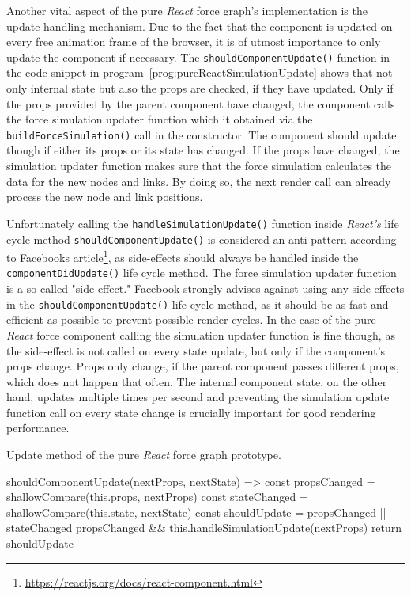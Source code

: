 Another vital aspect of the pure \emph{React} force graph's implementation is the update handling mechanism. Due to the fact that the component is updated on every free animation frame of the browser, it is of utmost importance to only update the component if necessary. The \texttt{shouldComponentUpdate()} function in the code snippet in program~\ref{prog:pureReactSimulationUpdate} shows that not only internal state but also the props are checked, if they have updated. Only if the props provided by the parent component have changed, the component calls the force simulation updater function which it obtained via the \texttt{buildForceSimulation()} call in the constructor. The component should update though if either its props or its state has changed. If the props have changed, the simulation updater function makes sure that the force simulation calculates the data for the new nodes and links. By doing so, the next render call can already process the new node and link positions.

Unfortunately calling the \texttt{handleSimulationUpdate()} function inside \emph{React's} life cycle method \texttt{should\-Component\-Update()} is considered an anti-pattern according to Facebooks article\footnote{\url{https://reactjs.org/docs/react-component.html}}, as side-effects should always be handled inside the \texttt{component\-Did\-Update()} life cycle method. The force simulation updater function is a so-called "side effect." Facebook strongly advises against using any side effects in the \texttt{should\-Component\-Update()} life cycle method, as it should be as fast and efficient as possible to prevent possible render cycles. In the case of the pure \emph{React} force component calling the simulation updater function is fine though, as the side-effect is not called on every state update, but only if the component's props change. Props only change, if the parent component passes different props, which does not happen that often. The internal component state, on the other hand, updates multiple times per second and preventing the simulation update function call on every state change is crucially important for good rendering performance.

\begin{program}
\caption{Update method of the pure \emph{React} force graph prototype.}
\label{prog:pureReactSimulationUpdate}
\begin{JsCode}
shouldComponentUpdate(nextProps, nextState) => {
  const propsChanged = shallowCompare(this.props, nextProps)
  const stateChanged = shallowCompare(this.state, nextState)
  const shouldUpdate = propsChanged || stateChanged
  propsChanged && this.handleSimulationUpdate(nextProps)
  return shouldUpdate
}
\end{JsCode}
\end{program}

